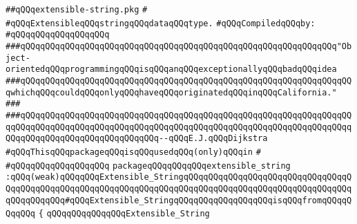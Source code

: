 \label{src/lib/x-kit/widget/old/text/extensible-string.pkg}
\verb|##qQQqextensible-string.pkg|\newline
\verb|#|\newline
\verb|#qQQqExtensibleqQQqstringqQQqdataqQQqtype.|\newline
\newline
\verb|#qQQqCompiledqQQqby:|\newline
\verb|#qQQqqQQqqQQqqQQqqQQq|\newline
\newline
\newline
\newline
\verb|###qQQqqQQqqQQqqQQqqQQqqQQqqQQqqQQqqQQqqQQqqQQqqQQqqQQqqQQqqQQqqQQq"Object-orientedqQQqprogrammingqQQqisqQQqanqQQqexceptionallyqQQqbadqQQqidea|\newline
\verb|###qQQqqQQqqQQqqQQqqQQqqQQqqQQqqQQqqQQqqQQqqQQqqQQqqQQqqQQqqQQqqQQqqQQqwhichqQQqcouldqQQqonlyqQQqhaveqQQqoriginatedqQQqinqQQqCalifornia."|\newline
\verb|###|\newline
\verb|###qQQqqQQqqQQqqQQqqQQqqQQqqQQqqQQqqQQqqQQqqQQqqQQqqQQqqQQqqQQqqQQqqQQqqQQqqQQqqQQqqQQqqQQqqQQqqQQqqQQqqQQqqQQqqQQqqQQqqQQqqQQqqQQqqQQqqQQqqQQqqQQqqQQqqQQqqQQqqQQqqQQqqQQq--qQQqE.J.qQQqDijkstra|\newline
\newline
\newline
\newline
\verb|#qQQqThisqQQqpackageqQQqisqQQqusedqQQq(only)qQQqin|\newline
\verb|#|\newline
\verb|#qQQqqQQqqQQqqQQqqQQq|\newline
\newline
\newline
\verb|packageqQQqqQQqqQQqextensible_string|\newline
\verb|:qQQq(weak)qQQqqQQqExtensible_StringqQQqqQQqqQQqqQQqqQQqqQQqqQQqqQQqqQQqqQQqqQQqqQQqqQQqqQQqqQQqqQQqqQQqqQQqqQQqqQQqqQQqqQQqqQQqqQQqqQQqqQQqqQQqqQQqqQQq#qQQqExtensible_StringqQQqqQQqqQQqqQQqqQQqisqQQqfromqQQqqQQqqQQq|\newline
\verb|{|\newline
\verb|qQQqqQQqqQQqqQQqExtensible_String|\newline
